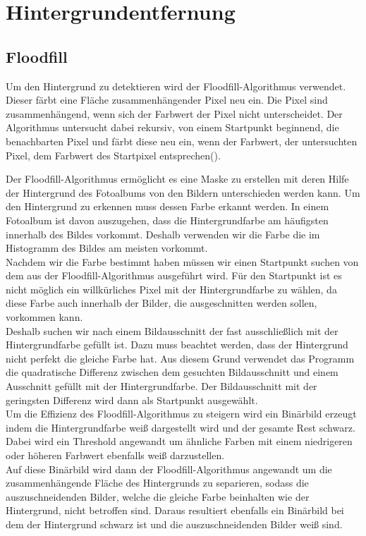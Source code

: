 \chapter{Hintergrundentfernung}

\section{Floodfill}
Um den Hintergrund zu detektieren wird der Floodfill-Algorithmus verwendet. Dieser färbt eine Fläche zusammenhängender Pixel neu ein. Die Pixel sind zusammenhängend, wenn sich der Farbwert der Pixel nicht unterscheidet. Der Algorithmus untersucht dabei rekursiv, von einem Startpunkt beginnend, die benachbarten Pixel und färbt diese neu ein, wenn der Farbwert, der untersuchten Pixel, dem Farbwert des Startpixel entsprechen(\cite{OpenCVFloodfill}).

Der Floodfill-Algorithmus ermöglicht es eine Maske zu erstellen mit deren Hilfe der Hintergrund des Fotoalbums von den Bildern unterschieden werden kann. Um den Hintergrund zu erkennen muss dessen Farbe erkannt werden. In einem Fotoalbum ist davon auszugehen, dass die Hintergrundfarbe am häufigsten innerhalb des Bildes vorkommt. Deshalb verwenden wir die Farbe die im Histogramm des Bildes am meisten vorkommt.\\
Nachdem wir die Farbe bestimmt haben müssen wir einen Startpunkt suchen von dem aus der Floodfill-Algorithmus ausgeführt wird. Für den Startpunkt ist es nicht möglich ein willkürliches Pixel mit der Hintergrundfarbe zu wählen, da diese Farbe auch innerhalb der Bilder, die ausgeschnitten werden sollen, vorkommen kann. \\
Deshalb suchen wir nach einem Bildausschnitt der fast ausschließlich mit der Hintergrundfarbe gefüllt ist. Dazu muss beachtet werden, dass der Hintergrund nicht perfekt die gleiche Farbe hat. Aus diesem Grund verwendet das Programm die quadratische Differenz zwischen dem gesuchten Bildausschnitt und einem Ausschnitt gefüllt mit der Hintergrundfarbe. Der Bildausschnitt mit der geringsten Differenz wird dann als Startpunkt ausgewählt.\\
Um die Effizienz des Floodfill-Algorithmus zu steigern wird ein Binärbild erzeugt indem die Hintergrundfarbe weiß dargestellt wird und der gesamte Rest schwarz. Dabei wird ein Threshold angewandt um ähnliche Farben mit einem niedrigeren oder höheren Farbwert ebenfalls weiß darzustellen. \\
Auf diese Binärbild wird dann der Floodfill-Algorithmus angewandt um die zusammenhängende Fläche des Hintergrunds zu separieren, sodass die auszuschneidenden Bilder, welche die gleiche Farbe beinhalten wie der Hintergrund, nicht betroffen sind. Daraus resultiert ebenfalls ein Binärbild bei dem der Hintergrund schwarz ist und die auszuschneidenden Bilder weiß sind.  

